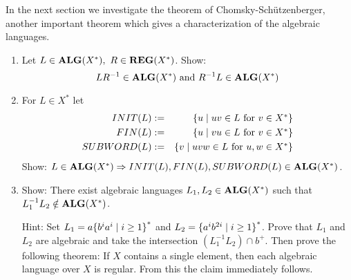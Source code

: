 In the next section we investigate the theorem of Chomsky-Schützenberger,
another important theorem which gives a characterization of the algebraic languages.

\begin{exercise}
\begin{enumerate}
  \item Let $L\in \mbox{{\bf ALG}}(X^*),\ R\in \mbox{{\bf REG}}(X^*)$. Show:
  \[ LR^{-1}\in \mbox{{\bf ALG}}(X^*)\text{ and }R^{-1}L\in \mbox{{\bf ALG}}(X^*) \]
  
  \item For $L\in X^*$ let
  \begin{eqnarray*}
  INIT(L) &:=& \mbox{$\{u\mid uv\in L\text{ for }v\in X^*\}$}\\
  FIN(L) &:=& \mbox{$\{u\mid vu\in L\text{ for }v\in X^*\}$}\\
  SUBWORD(L) &:=& \mbox{$\{v\mid uvw\in L\text{ for }u,w\in X^*\}$}
  \end{eqnarray*}
  Show: $L\in \mbox{{\bf ALG}}(X^*) \Rightarrow INIT(L), FIN(L), SUBWORD(L)\in \mbox{{\bf ALG}}(X^*)$.
  
  \item Show: There exist algebraic languages $L_1, L_2\in \mbox{{\bf ALG}}(X^*)$ such that
  $L_1^{-1} L_2 \notin \mbox{{\bf ALG}}(X^*)$.
  
  Hint: Set $L_1 = a \mbox{$\{b^ia^i\mid i\geq 1\}$}^*$ and $L_2 =
  \mbox{$\{a^{i}b^{2i}\mid i\geq 1\}$}^*$. Prove that $L_1$ and $L_2$ are algebraic
  and take the intersection $(L_1^{-1}L_2)\cap b^+$. Then prove the following
  theorem: If $X$ contains a single element, then each algebraic language over
  $X$ is regular. From this the claim immediately follows.
\end{enumerate}
\end{exercise}

